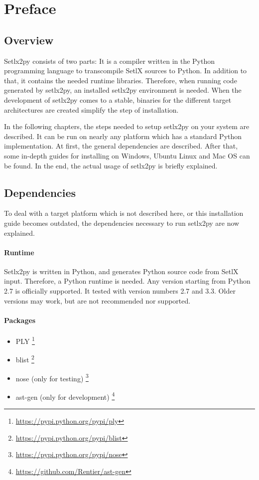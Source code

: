 
\section{Preface}

\subsection{Overview}

Setlx2py consists of two parts: It is a compiler written in the Python programming language to transcompile SetlX sources to Python. In addition to that, it contains the needed runtime libraries. Therefore, when running code generated by setlx2py, an installed setlx2py environment is needed. When the development of setlx2py comes to a stable, binaries for the different target architectures are created simplify the step of installation.

In the following chapters, the steps needed to setup setlx2py on your system are described. It can be run on nearly any platform which has a standard Python implementation. At first, the general dependencies are described. After that, some in-depth guides for installing on Windows, Ubuntu Linux and Mac OS can be found. In the end, the actual usage of setlx2py is briefly explained.

\subsection{Dependencies}

To deal with a target platform which is not described here, or this installation guide becomes outdated, the dependencies necessary to run setlx2py are now explained.

\paragraph{Runtime}

Setlx2py is written in Python, and generates Python source code from SetlX input. Therefore, a Python runtime is needed. Any version starting from Python 2.7 is officially supported. It tested with version numbers 2.7 and 3.3. Older versions may work, but are not recommended nor supported.

\paragraph{Packages}

\begin{itemize}
\item PLY \footnote{\url{https://pypi.python.org/pypi/ply}}
\item blist \footnote{\url{https://pypi.python.org/pypi/blist}}
\item nose (only for testing) \footnote{\url{https://pypi.python.org/pypi/nose}}
\item ast-gen (only for development) \footnote{\url{https://github.com/Rentier/ast-gen}}

\end{itemize}